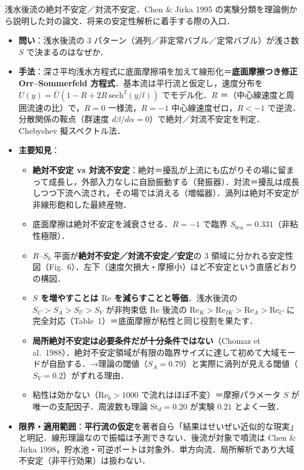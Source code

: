 \documentclass[11pt]{jsarticle}
\newcommand{\litref}[1]{{\large\bfseries\color{citecolor}#1}}
\begin{document}
\noindent\litref{Chen \& Jirka (1997)}\quad 浅水後流の絶対不安定／対流不安定．Chen \& Jirka 1995 の実験分類を理論側から説明した対の論文．将来の安定性解析に着手する際の入口．
\begin{itemize}
  \item \textbf{問い}：浅水後流の 3 パターン（渦列／非定常バブル／定常バブル）が浅さ数 $S$ で決まるのはなぜか．
  \item \textbf{手法}：深さ平均浅水方程式に底面摩擦項を加えて線形化＝\textbf{底面摩擦つき修正 Orr--Sommerfeld 方程式}．基本流は平行流と仮定し，速度分布を $U(y) = \bar{U}(1 - R + 2R\,\mathrm{sech}^2(y/l))$ でモデル化．$R$ ＝（中心線速度と周囲流速の比）で，$R = 0$ 一様流，$R = -1$ 中心線速度ゼロ，$R < -1$ で逆流．分散関係の鞍点（群速度 $d\beta/d\alpha = 0$）で絶対／対流不安定を判定．Chebyshev 擬スペクトル法．
  \item \textbf{主要知見}：
  \begin{itemize}
    \item \textbf{絶対不安定 vs 対流不安定}：絶対＝擾乱が上流にも広がりその場に留まって成長し，外部入力なしに自励振動する（発振器）．対流＝擾乱は成長しつつ下流へ流され，その場では消える（増幅器）．渦列は絶対不安定が非線形飽和した最終産物．
    \item 底面摩擦は絶対不安定を減衰させる．$R = -1$ で臨界 $S_{bca} = 0.331$（非粘性極限）．
    \item $R$--$S_b$ 平面が\textbf{絶対不安定／対流不安定／安定}の 3 領域に分かれる安定性図（Fig.~6）．左下（速度欠損大・摩擦小）ほど不安定という直感どおりの構図．
    \item \textbf{$S$ を増やすことは $\mathrm{Re}$ を減らすことと等価}．浅水後流の $S_C > S_A > S_U > S_V$ が非拘束低 $\mathrm{Re}$ 後流の $\mathrm{Re}_K > \mathrm{Re}_{IK} > \mathrm{Re}_A > \mathrm{Re}_C$ に完全対応（Table~1）＝底面摩擦が粘性と同じ役割を果たす．
    \item \textbf{局所絶対不安定は必要条件だが十分条件ではない}（Chomaz et al.\ 1988）．絶対不安定領域が有限の臨界サイズに達して初めて大域モードが自励する．→理論の閾値（$S_A = 0.79$）と実際に渦列が見える閾値（$S_V = 0.2$）がずれる理由．
    \item 粘性は効かない（$\mathrm{Re}_b > 1000$ で流れはほぼ不変）＝摩擦パラメータ $S$ が唯一の支配因子．周波数も理論 $\mathrm{St}_d = 0.20$ が実験 $0.21$ とよく一致．
  \end{itemize}
  \item \textbf{限界・適用範囲}：\textbf{平行流の仮定}を著者自ら「結果はせいぜい近似的な現実」と明記．線形理論なので振幅は予測できない．後流が対象で噴流は Chen \& Jirka 1998，貯水池・可逆ポートは対象外．単方向流．局所解析であり大域不安定（非平行効果）は扱わない．

\end{itemize}
\end{document}
